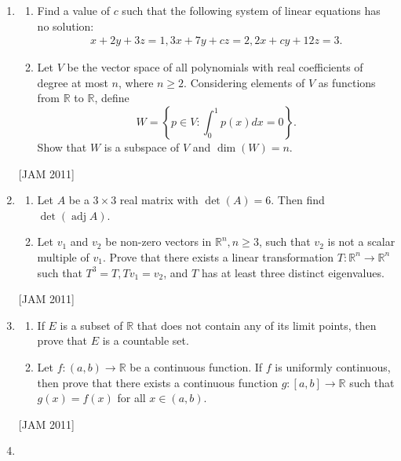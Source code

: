 \begin{enumerate}
 \item  
\begin{enumerate}
    \item  Find a value of $c$ such that the following system of linear equations has no solution:
$$
\begin{gathered}
x+2 y+3 z=1,  
3 x+7 y+c z=2,  
2 x+c y+12 z=3 .
\end{gathered}
$$
\item  Let $V$ be the vector space of all polynomials with real coefficients of degree at most $n$, where $n \geq 2$. Considering elements of $V$ as functions from $\mathbb{R}$ to $\mathbb{R}$, define
$$
W=\left\{p \in V: \int_{0}^{1} p(x) d x=0\right\} .
$$
Show that $W$ is a subspace of $V$ and $\operatorname{dim}(W)=n$.

\end{enumerate}
\hfill [JAM 2011]


\item
\begin{enumerate}
     \item  Let $A$ be a $3 \times 3$ real matrix with $\operatorname{det}(A)=6$. Then find $\operatorname{det}(\operatorname{adj} A)$.

\item  Let $v_{1}$ and $v_{2}$ be non-zero vectors in $\mathbb{R}^{n}, n \geq 3$, such that $v_{2}$ is not a scalar multiple of $v_{1}$. Prove that there exists a linear transformation $T: \mathbb{R}^{n} \rightarrow \mathbb{R}^{n}$ such that $T^{3}=T, T v_{1}=v_{2}$, and $T$ has at least three distinct eigenvalues.
\end{enumerate}
\hfill [JAM 2011]

 

\item  
\begin{enumerate}
    \item  If $E$ is a subset of $\mathbb{R}$ that does not contain any of its limit points, then prove that $E$ is a countable set.


\item Let $f:(a, b) \rightarrow \mathbb{R}$ be a continuous function. If $f$ is uniformly continuous, then prove that there exists a continuous function $g:[a, b] \rightarrow \mathbb{R}$ such that $g(x)=f(x)$ for all $x \in(a, b)$.
\end{enumerate}
\hfill [JAM 2011]



\item  
\begin{enumerate}
    

\end{enumerate}
\end{enumerate}

